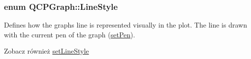 \subsubsection[{\texorpdfstring{Line\+Style}{LineStyle}}]{\setlength{\rightskip}{0pt plus 5cm}enum {\bf Q\+C\+P\+Graph\+::\+Line\+Style}}\hypertarget{class_q_c_p_graph_ad60175cd9b5cac937c5ee685c32c0859}{}\label{class_q_c_p_graph_ad60175cd9b5cac937c5ee685c32c0859}
Defines how the graph\textquotesingle{}s line is represented visually in the plot. The line is drawn with the current pen of the graph (\hyperlink{class_q_c_p_abstract_plottable_ab74b09ae4c0e7e13142fe4b5bf46cac7}{set\+Pen}). \begin{DoxySeeAlso}{Zobacz również}
\hyperlink{class_q_c_p_graph_a513fecccff5b2a50ce53f665338c60ff}{set\+Line\+Style} 
\end{DoxySeeAlso}
